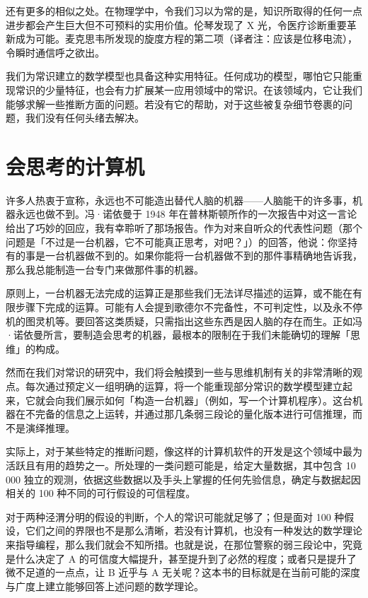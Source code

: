 还有更多的相似之处。在物理学中，令我们习以为常的是，知识所取得的任何一点进步都会产生巨大但不可预料的实用价值。伦琴发现了 X 光，令医疗诊断重要革新成为可能。麦克思韦所发现的旋度方程的第二项（译者注：应该是位移电流），令瞬时通信呼之欲出。

我们为常识建立的数学模型也具备这种实用特征。任何成功的模型，哪怕它只能重现常识的少量特征，也会有力扩展某一应用领域中的常识。在该领域内，它让我们能够求解一些推断方面的问题。若没有它的帮助，对于这些被复杂细节卷裹的问题，我们没有任何头绪去解决。

\section{会思考的计算机}

许多人热衷于宣称，永远也不可能造出替代人脑的机器——人脑能干的许多事，机器永远也做不到。冯·诺依曼于 1948 年在普林斯顿所作的一次报告中对这一言论给出了巧妙的回应，我有幸聆听了那场报告。作为对来自听众的代表性问题（那个问题是「不过是一台机器，它不可能真正思考，对吧？」）的回答，他说：你坚持有的事是一台机器做不到的。如果你能将一台机器做不到的那件事精确地告诉我，那么我总能制造一台专门来做那件事的机器。

原则上，一台机器无法完成的运算正是那些我们无法详尽描述的运算，或不能在有限步骤下完成的运算。可能有人会提到歌德尔不完备性，不可判定性，以及永不停机的图灵机等。要回答这类质疑，只需指出这些东西是因人脑的存在而生。正如冯·诺依曼所言，要制造会思考的机器，最根本的限制在于我们未能确切的理解「思维」的构成。

然而在我们对常识的研究中，我们将会触摸到一些与思维机制有关的非常清晰的观点。每次通过预定义一组明确的运算，将一个能重现部分常识的数学模型建立起来，它就会向我们展示如何「构造一台机器」（例如，写一个计算机程序）。这台机器在不完备的信息之上运转，并通过那几条弱三段论的量化版本进行可信推理，而不是演绎推理。

实际上，对于某些特定的推断问题，像这样的计算机软件的开发是这个领域中最为活跃且有用的趋势之一。所处理的一类问题可能是，给定大量数据，其中包含 10 000 独立的观测，依据这些数据以及手头上掌握的任何先验信息，确定与数据起因相关的 100 种不同的可行假设的可信程度。

对于两种泾渭分明的假设的判断，个人的常识可能就足够了；但是面对 100 种假设，它们之间的界限也不是那么清晰，若没有计算机，也没有一种发达的数学理论来指导编程，那么我们就会不知所措。也就是说，在那位警察的弱三段论中，究竟是什么决定了 A 的可信度大幅提升，甚至提升到了必然的程度；或者只是提升了微不足道的一点点，让 B 近乎与 A 无关呢？这本书的目标就是在当前可能的深度与广度上建立能够回答上述问题的数学理论。

